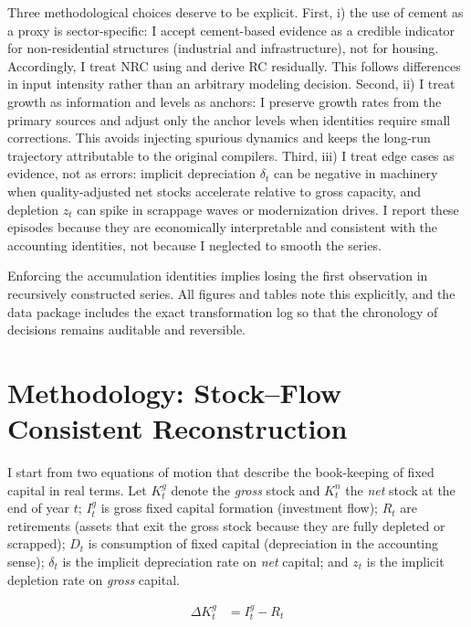 Three methodological choices deserve to be explicit. First, i) the use of cement as a proxy is sector-specific: I accept cement-based evidence as a credible indicator for non-residential structures (industrial and infrastructure), not for housing. Accordingly, I treat NRC using \citet{Tafunell2016} and derive RC residually. This follows differences in input intensity rather than an arbitrary modeling decision. Second, ii) I treat growth as information and levels as anchors: I preserve growth rates from the primary sources and adjust only the anchor levels when identities require small corrections. This avoids injecting spurious dynamics and keeps the long-run trajectory attributable to the original compilers. Third, iii) I treat edge cases as evidence, not as errors: implicit depreciation $\delta_t$ can be negative in machinery when quality-adjusted net stocks accelerate relative to gross capacity, and depletion $z_t$ can spike in scrappage waves or modernization drives. I report these episodes because they are economically interpretable and consistent with the accounting identities, not because I neglected to smooth the series.

Enforcing the accumulation identities implies losing the first observation in recursively constructed series. All figures and tables note this explicitly, and the data package includes the exact transformation log so that the chronology of decisions remains auditable and reversible.



\section{Methodology: Stock–Flow Consistent Reconstruction}\label{sec:method}


I start from two equations of motion that describe the book-keeping of fixed capital in real terms. Let $K^g_t$ denote the \emph{gross} stock and $K^n_t$ the \emph{net} stock at the end of year $t$; $I^g_t$ is gross fixed capital formation (investment flow); $R_t$ are retirements (assets that exit the gross stock because they are fully depleted or scrapped); $D_t$ is consumption of fixed capital (depreciation in the accounting sense); $\delta_t$ is the implicit depreciation rate on \emph{net} capital; and $z_t$ is the implicit depletion rate on \emph{gross} capital.

\begin{align}
\Delta K^g_t &= I^g_t - R_t \tag{1}\label{eq:gross_motion}
\end{align}

